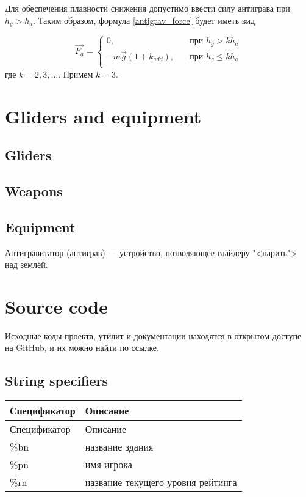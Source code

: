 \documentclass[a4paper,12pt]{report}
\begin{document}
Для обеспечения плавности снижения допустимо ввести силу антиграва при $h_{g} > h_a$. Таким образом, формула \eqref{antigrav_force} будет иметь вид

\begin{equation}
\vec{F_a} =
\begin{cases}
0, & \quad \text{при } h_{g} > k h_a \\
-m\vec{g}(1+ k_{add}), & \quad \text{при } h_{g} \le k h_a \\
\end{cases}
\end{equation}
где $k=2,3,\dots$. Примем $k=3$.

\chapter{Gliders and equipment}
\section{Gliders}
\section{Weapons}
\section{Equipment}

Антигравитатор (антиграв) --- устройство, позволяющее глайдеру "<парить"> над землёй.

\chapter{Source code}

Исходные коды проекта, утилит и документации находятся в открытом доступе на GitHub, и их можно найти по \href{https://github.com/aimrebirth}{ссылке}.

\section{String specifiers}

\begin{longtable}{|l|l|}
\hline

Спецификатор & Описание\\ \hline
\endfirsthead

\hline
Спецификатор & Описание\\ \hline
\endhead

\%bn & название здания \\ \hline
\%pn & имя игрока \\ \hline
\%rn & название текущего уровня рейтинга \\ \hline

\end{longtable}
\end{document}
